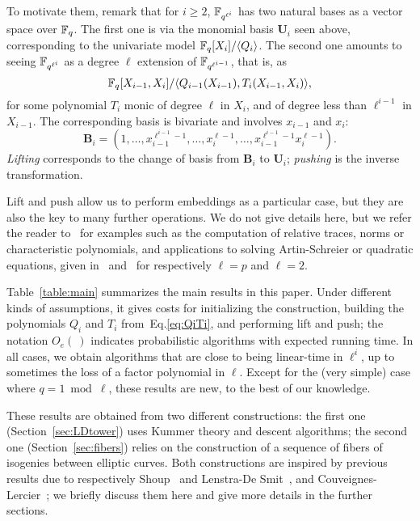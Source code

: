 \documentclass{sig-alternate}
\newcommand{\bb}{\mathbf{B}}
\newcommand{\uu}{\mathbf{U}}  %
\begin{document}
To motivate them, remark that for $i \ge 2$, $\mathbb{F}_{q^{\ell^{i}}}$ has
two natural bases as a vector space over $\mathbb{F}_q$. The first one is via
the monomial basis $\uu_{i}$ seen above, corresponding to the
univariate model $\mathbb{F}_q[X_{i}]/ \langle Q_{i} \rangle$. The second one
amounts to seeing $\mathbb{F}_{q^{\ell^{i}}}$ as a degree $\ell$ extension of
$\mathbb{F}_{q^{\ell^{i-1}}}$, that is, as
\begin{equation}\label{eq:QiTi}
\mathbb{F}_q[X_{i-1},X_i]/\langle Q_{i-1}(X_{i-1}), T_i(X_{i-1},X_i)\rangle,  
\end{equation}
for some polynomial $T_i$ monic of degree $\ell$ in $X_{i}$, and of
degree less than $\ell^{i-1}$ in $X_{i-1}$.  The corresponding basis is
bivariate and involves $x_{i-1}$ and $x_i$:
\begin{equation}
  \label{eq:bi-basis}
  \bb_{i} = (1,\ldots,x_{i-1}^{\ell^{i-1}-1},\ldots,x_i^{\ell-1},\ldots,x_{i-1}^{\ell^{i-1}-1}x_i^{\ell-1}).
\end{equation}
{\em Lifting} corresponds to the change of basis from $\bb_i$ to
$\uu_i$; {\em pushing} is the inverse transformation.

Lift and push allow us to perform embeddings as a particular case, but
they are also the key to many further operations. We do not give
details here, but we refer the reader
to~\cite{df+schost12,DoSc12,LeSc12} for examples such as the
computation of relative traces, norms or characteristic polynomials,
and applications to solving Artin-Schreier or quadratic equations,
given in~\cite{df+schost12} and~\cite{DoSc12} for respectively
$\ell=p$ and $\ell=2$.

Table~\ref{table:main} summarizes the main results in this paper.
Under different kinds of assumptions, it gives costs for initializing
the construction, building the polynomials $Q_i$ and $T_i$
from~Eq.\eqref{eq:QiTi}, and performing lift and push; the notation
$O_e(\ )$ indicates probabilistic algorithms with expected running
time. In all cases, we obtain algorithms that are close to being
linear-time in $\ell^i$, up to sometimes the loss of a factor
polynomial in $\ell$. Except for the (very simple) case where $q=1 \bmod
\ell$, these results are new, to the best of our knowledge.

These results are obtained from two different constructions: the first
one (Section~\ref{sec:LDtower}) uses Kummer theory and descent
algorithms; the second one (Section~\ref{sec:fibers}) relies on the
construction of a sequence of fibers of isogenies between elliptic
curves. Both constructions are inspired by previous results due to
respectively Shoup~\cite{Shoup90,shoup94} and Lenstra-De
Smit~\cite{lenstra+desmit08-stdmodels}, and
Couveignes-Lercier~\cite{couveignes+lercier11}; we briefly discuss
them here and give more details in the further sections.
\end{document}
